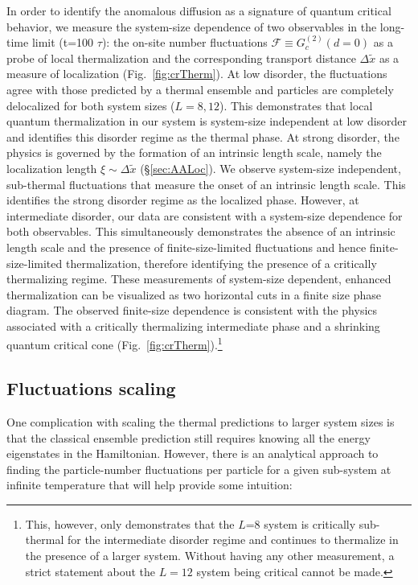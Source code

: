 In order to identify the anomalous diffusion as a signature of quantum critical behavior, we measure the system-size dependence of two observables in the long-time limit (t=100 $\tau$): the on-site number fluctuations $\mathcal{F} \equiv G_c^{(2)} (d=0) $ as a probe of local thermalization and the corresponding transport distance $\Delta \tilde{x}$ as a measure of localization (Fig.~\ref{fig:crTherm}). At low disorder, the fluctuations agree with those predicted by a thermal ensemble and particles are completely delocalized for both system sizes ($L=8,12$). This demonstrates that local quantum thermalization in our system is system-size independent at low disorder and identifies this disorder regime as the thermal phase. At strong disorder, the physics is governed by the formation of an intrinsic length scale, namely the localization length $\xi \sim \Delta \tilde{x}$ \cite{Choi2016,Lukin2019}(\S \ref{sec:AALoc}). We observe system-size independent, sub-thermal fluctuations that measure the onset of an intrinsic length scale. This identifies the strong disorder regime as the localized phase. However, at intermediate disorder, our data are consistent with a system-size dependence for both observables. This simultaneously demonstrates the absence of an intrinsic length scale and the presence of finite-size-limited fluctuations and hence finite-size-limited thermalization, therefore identifying the presence of a critically thermalizing regime. These measurements of system-size dependent, enhanced thermalization can be visualized as two horizontal cuts in a finite size phase diagram. The observed finite-size dependence is consistent with the physics associated with a critically thermalizing intermediate phase and a shrinking quantum critical cone (Fig.~\ref{fig:crTherm}).\footnote{This, however, only demonstrates that the $L$=$8$ system is critically sub-thermal for the intermediate disorder regime and continues to thermalize in the presence of a larger system. Without having any other measurement, a strict statement about the $L=12$ system being critical cannot be made.}

\subsection{Fluctuations scaling}

One complication with scaling the thermal predictions to larger system sizes is that the classical ensemble prediction still requires knowing all the energy eigenstates in the Hamiltonian. However, there is an analytical approach to finding the particle-number fluctuations per particle for a given sub-system at infinite temperature that will help provide some intuition:

